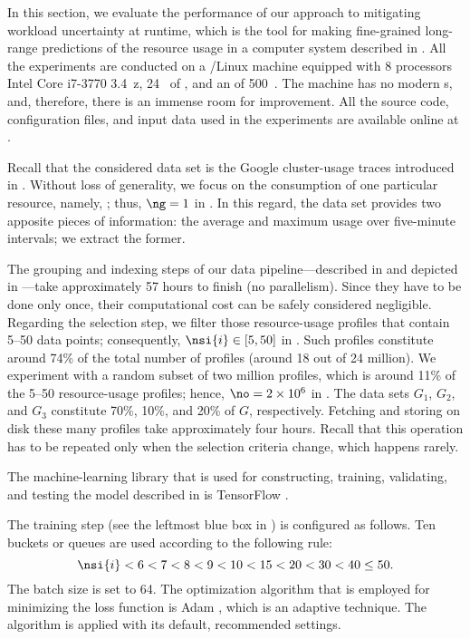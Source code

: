 In this section, we evaluate the performance of our approach to mitigating
workload uncertainty at runtime, which is the tool for making fine-grained
long-range predictions of the resource usage in a computer system described in
. All the experiments are conducted on a /Linux
machine equipped with 8 processors Intel Core i7-3770 3.4~z, 24~
of , and an  of 500~. The machine has no modern
s, and, therefore, there is an immense room for improvement. All the
source code, configuration files, and input data used in the experiments are
available online at \cite{eslab2017b}.


Recall that the considered data set is the Google cluster-usage traces
\cite{reiss2011} introduced in . Without loss of generality, we
focus on the consumption of one particular resource, namely, ; thus,
$\ng = 1$ in . In this regard, the data set provides two
apposite pieces of information: the average and maximum  usage over
five-minute intervals; we extract the former.

The grouping and indexing steps of our data pipeline---described in
 and depicted in ---take approximately 57
hours to finish (no parallelism). Since they have to be done only once, their
computational cost can be safely considered negligible. Regarding the selection
step, we filter those resource-usage profiles that contain 5--50 data points;
consequently, $\nsi{i} \in [5, 50]$ in . Such profiles
constitute around 74\% of the total number of profiles (around 18 out of 24
million). We experiment with a random subset of two million profiles, which is
around 11\% of the 5--50 resource-usage profiles; hence, $\no = 2 \times 10^6$
in . The data sets $G_1$, $G_2$, and $G_3$ constitute 70\%,
10\%, and 20\% of $G$, respectively. Fetching and storing on disk these many
profiles take approximately four hours. Recall that this operation has to be
repeated only when the selection criteria change, which happens rarely.


The machine-learning library that is used for constructing, training,
validating, and testing the model described in  is TensorFlow
\cite{abadi2015}.

The training step (see the leftmost blue box in ) is
configured as follows. Ten buckets or queues are used according to the following
rule:
\[
  \nsi{i} < 6 < 7 < 8 < 9 < 10 < 15 < 20 < 30 < 40 \leq 50.
\]
The batch size \nb is set to 64. The optimization algorithm that is employed for
minimizing the loss function is Adam \cite{kingma2014}, which is an adaptive
technique. The algorithm is applied with its default, recommended settings.

